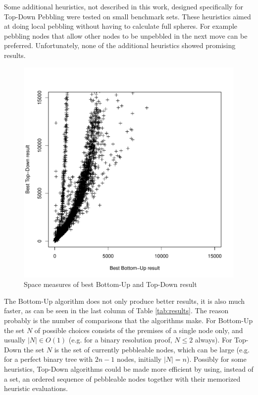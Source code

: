 Some additional heuristics, not described in this work, designed specifically for Top-Down Pebbling were tested on small benchmark sets.
These heuristics aimed at doing local pebbling without having to calculate full spheres.
For example pebbling nodes that allow other nodes to be unpebbled in the next move can be preferred.
Unfortunately, none of the additional heuristics showed promising results.


\begin{figure}
	\centering
	\includegraphics[scale=0.5]{Figures/td_vs_bu.pdf}
	\caption{Space measures of best Bottom-Up and Top-Down result}
	\label{fig:BUvsTD}
\end{figure}

The Bottom-Up algorithm does not only produce better results, it is also much faster, as can be seen in the last column of Table \ref{tab:results}. 
The reason probably is the number of comparisons that the algorithms make. 
For Bottom-Up the set $N$ of possible choices consists of the premises of a single node only, and usually $|N| \in O(1)$ (e.g. for a binary resolution proof, $N \leq 2$ always). 
For Top-Down the set $N$ is the set of currently pebbleable nodes, which can be large (e.g. for a perfect binary tree with $2n -1$ nodes, initially $|N| = n$). 
Possibly for some heuristics, Top-Down algorithms could be made more efficient by using, instead of a set, an ordered sequence of pebbleable nodes together with their memorized heuristic evaluations.

